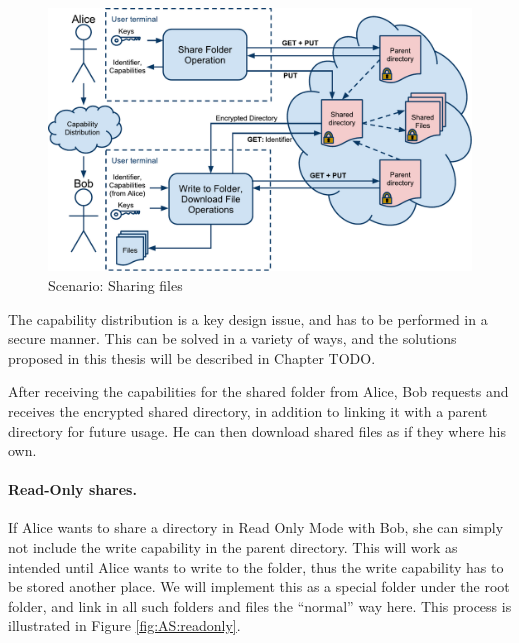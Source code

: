 \documentclass[pdftex,english,10pt,b5paper,twoside]{book}
\begin{document}
\begin{figure}[h!]
    \centering
    \includegraphics[width=\columnwidth]{ArchitectureShare.pdf}
    \caption{Scenario: Sharing files}
    \label{fig:AS:sharing}
\end{figure}

The capability distribution is a key design issue, and has to be performed in a
secure manner. This can be solved in a variety of ways, and the solutions
proposed in this thesis will be described in Chapter TODO.

After receiving the capabilities for the shared folder from Alice, Bob requests
and receives the encrypted shared directory, in addition to linking it with a
parent directory for future usage. He can then download shared files as if they
where his own.

\paragraph{Read-Only shares.}

If Alice wants to share a directory in Read Only Mode with Bob, she can simply
not include the write capability in the parent directory. This will work as
intended until Alice wants to write to the folder, thus the write capability has to
be stored another place. We will implement this as a special folder under the
root folder, and link in all such folders and files the ``normal'' way here.
This process is illustrated in Figure \ref{fig:AS:readonly}.
\end{document}
